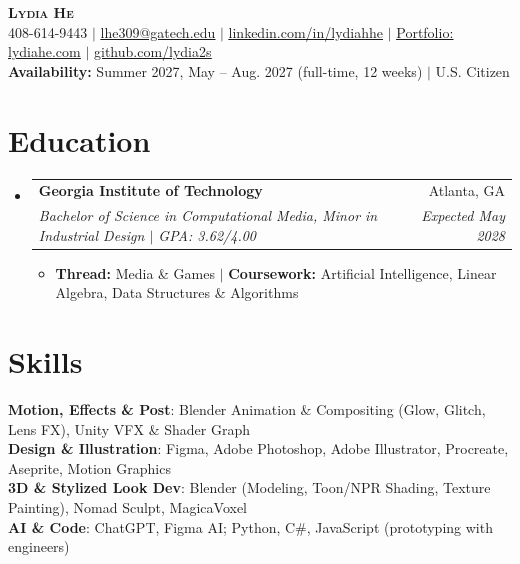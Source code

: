 \documentclass[letterpaper,11pt]{article}
\makeatletter
\newcommand{\resumeItem}[1]{
  \item\small{
    {#1 \vspace{-2pt}}
  }
}
\newcommand{\resumeSubheading}[4]{
  \vspace{-2pt}\item
    \begin{tabular*}{0.97\textwidth}[t]{l@{\extracolsep{\fill}}r}
      \textbf{#1} & #2 \\
      \textit{\small#3} & \textit{\small #4} \\
    \end{tabular*}\vspace{-7pt}
}
\newcommand{\resumeSubHeadingListStart}{\begin{itemize}[leftmargin=0.15in, label={}]}
\newcommand{\resumeSubHeadingListEnd}{\end{itemize}}
\newcommand{\resumeItemListStart}{\begin{itemize}}
\newcommand{\resumeItemListEnd}{\end{itemize}\vspace{-5pt}}
\makeatother
\begin{document}
\begin{center}
    \textbf{\Huge \scshape Lydia He} \\ \vspace{1pt}
    \small 408-614-9443 $|$ \href{mailto:lhe309@gatech.edu}{\underline{lhe309@gatech.edu}} $|$
    \href{https://www.linkedin.com/in/lydiahhe}{\underline{linkedin.com/in/lydiahhe}} $|$
    \href{https://lydiahe.com}{\underline{Portfolio: lydiahe.com}} $|$
    \href{https://github.com/lydia2s}{\underline{github.com/lydia2s}} \\ \vspace{2pt}
    \small \textbf{Availability:} Summer 2027, May -- Aug. 2027 (full-time, 12 weeks) $|$ U.S. Citizen %
\end{center}


\section{Education}
  \resumeSubHeadingListStart
    \resumeSubheading
      {Georgia Institute of Technology}{Atlanta, GA}
      {Bachelor of Science in Computational Media, Minor in Industrial Design $|$ GPA: 3.62/4.00}{Expected May 2028}
      \resumeItemListStart
        \resumeItem{\textbf{Thread:} Media \& Games $|$ \textbf{Coursework:} Artificial Intelligence, Linear Algebra, Data Structures \& Algorithms}
      \resumeItemListEnd
  \resumeSubHeadingListEnd


\section{Skills}
 \begin{itemize}[leftmargin=0.15in, label={}]
    \small{\item{
     \textbf{Motion, Effects \& Post}{: Blender Animation \& Compositing (Glow, Glitch, Lens FX), Unity VFX \& Shader Graph} \\
     \textbf{Design \& Illustration}{: Figma, Adobe Photoshop, Adobe Illustrator, Procreate, Aseprite, Motion Graphics} \\
     \textbf{3D \& Stylized Look Dev}{: Blender (Modeling, Toon/NPR Shading, Texture Painting), Nomad Sculpt, MagicaVoxel} \\
     \textbf{AI \& Code}{: ChatGPT, Figma AI; Python, C\#, JavaScript (prototyping with engineers)}
    }}
 \end{itemize}
\end{document}
